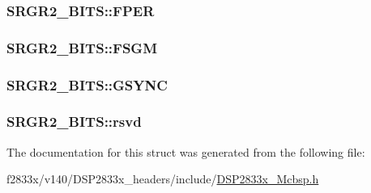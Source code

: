 \subsubsection[{F\+P\+E\+R}]{ S\+R\+G\+R2\+\_\+\+B\+I\+T\+S\+::\+F\+P\+E\+R}\label{struct_s_r_g_r2___b_i_t_s_abe6462a3a5bc8b6e627136e31b8b7f67}
\hypertarget{struct_s_r_g_r2___b_i_t_s_aea1c2a5bd5f03db780280d379c5bcba8}{}
\subsubsection[{F\+S\+G\+M}]{ S\+R\+G\+R2\+\_\+\+B\+I\+T\+S\+::\+F\+S\+G\+M}\label{struct_s_r_g_r2___b_i_t_s_aea1c2a5bd5f03db780280d379c5bcba8}
\hypertarget{struct_s_r_g_r2___b_i_t_s_a7a4c30e857ed364050681bd066d68616}{}
\subsubsection[{G\+S\+Y\+N\+C}]{ S\+R\+G\+R2\+\_\+\+B\+I\+T\+S\+::\+G\+S\+Y\+N\+C}\label{struct_s_r_g_r2___b_i_t_s_a7a4c30e857ed364050681bd066d68616}
\hypertarget{struct_s_r_g_r2___b_i_t_s_ad8ea5f38a2aba7d6200c1eba7e6a949a}{}
\subsubsection[{rsvd}]{ S\+R\+G\+R2\+\_\+\+B\+I\+T\+S\+::rsvd}\label{struct_s_r_g_r2___b_i_t_s_ad8ea5f38a2aba7d6200c1eba7e6a949a}


The documentation for this struct was generated from the following file\+:\begin{DoxyCompactItemize}
\item 
f2833x/v140/\+D\+S\+P2833x\+\_\+headers/include/\hyperlink{_d_s_p2833x___mcbsp_8h}{D\+S\+P2833x\+\_\+\+Mcbsp.\+h}\end{DoxyCompactItemize}
